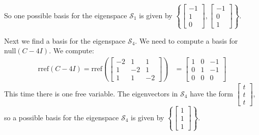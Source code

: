 \documentclass{ximera}
\begin{document}
\begin{example}
\begin{explanation}
So one possible basis for the eigenspace $\mathcal{S}_1$ is given by $\left\{\begin{bmatrix}-1\\1\\0\end{bmatrix}, \begin{bmatrix}-1\\0\\1\end{bmatrix}\right\}$.
    
Next we find a basis for the eigenspace $\mathcal{S}_4$.  We need to compute a basis for $\mbox{null}(C-4I)$.  We compute:
\begin{align*}\mbox{rref}(C-4I)=\mbox{rref}\left(\begin{bmatrix} -2 & 1 & 1\\ 1 & -2 & 1\\ 1 & 1 & -2\end{bmatrix}\right)&=\begin{bmatrix} 1 & 0 & -1\\ 0 & 1 & -1\\ 0 & 0 & 0\end{bmatrix}
\end{align*}
This time there is one free variable.  %
The eigenvectors in $\mathcal{S}_4$ have the form $\begin{bmatrix}t\\t\\t\end{bmatrix}$, so a possible basis for the eigenspace $\mathcal{S}_4$ is given by $\left\{\begin{bmatrix}1\\1\\1\end{bmatrix}\right\}$.
\end{explanation}
\end{example}
    
\end{document}
